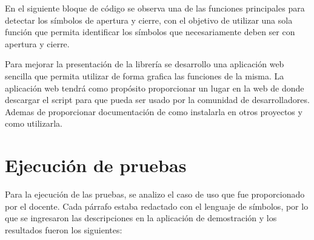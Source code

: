 

En el siguiente bloque de código se observa una de las funciones principales para detectar los símbolos de apertura y cierre, con el objetivo de utilizar una sola función que permita identificar los símbolos que necesariamente deben ser con apertura y cierre. 



Para mejorar la presentación de la librería se desarrollo una aplicación web sencilla que permita utilizar de forma grafica las funciones de la misma. La aplicación web tendrá como propósito proporcionar un lugar en la web de donde descargar el script para que pueda ser usado por la comunidad de desarrolladores. Ademas de proporcionar documentación de como instalarla en otros proyectos y como utilizarla.  

\section{Ejecución de pruebas}

Para la ejecución de las pruebas, se analizo el caso de uso que fue proporcionado por el docente. Cada párrafo estaba redactado con el lenguaje de símbolos, por lo que se ingresaron las descripciones en la aplicación de demostración y los resultados fueron los siguientes:

